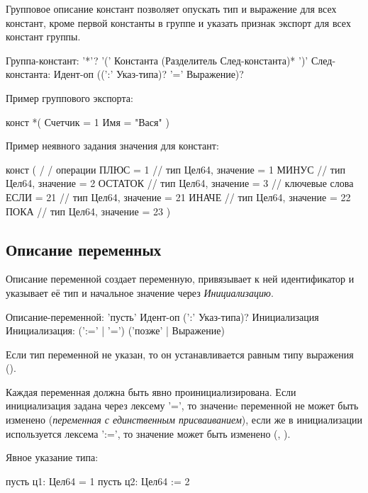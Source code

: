 Групповое описание констант позволяет опускать тип и выражение для всех констант, кроме первой константы в группе и указать признак экспорт для всех констант группы.

\begin{Grammar}
Группа-констант: 
    '*'? '(' 
    Константа (Разделитель След-константа)* 
    ')'
След-константа: Идент-оп ((':' Указ-типа)? '=' Выражение)?
\end{Grammar} 

Пример группового экспорта:
\begin{Trivil}[vspace=2pt]
конст *(
    Счетчик = 1
    Имя = "Вася"
)
\end{Trivil}

Пример неявного задания значения для констант:
\begin{Trivil}[vspace=2pt]
конст ( 
    / / операции
    ПЛЮС = 1   // тип Цел64, значение = 1
    МИНУС       // тип Цел64, значение = 2  
    ОСТАТОК   // тип Цел64, значение = 3 
    // ключевые слова
    ЕСЛИ = 21   // тип Цел64, значение = 21
    ИНАЧЕ        // тип Цел64, значение = 22
    ПОКА          // тип Цел64, значение = 23
)
\end{Trivil}


\hypertarget{variables}{%
\subsection{Описание переменных}\label{decls:variables}}

Описание переменной создает переменную, привязывает к ней идентификатор и указывает её тип и начальное значение через \emph{Инициализацию}. 

\begin{Grammar}
Описание-переменной: 
    'пусть' Идент-оп (':' Указ-типа)? Инициализация
Инициализация: (':=' | '=') ('позже' | Выражение)
\end{Grammar} 

Если тип переменной не указан, то он устанавливается равным типу выражения ().

Каждая переменная должна быть явно проинициализирована.
Если инициализация задана через лексему '=', то значениe переменной не может быть изменено (\emph{переменная с единственным присваиванием}), 
если же в инициализации используется лексема ':=', то значение может быть изменено (, ).

Явное указание типа:
\begin{Trivil}[vspace=2pt]
пусть ц1: Цел64 = 1 
пусть ц2: Цел64 := 2
\end{Trivil}

